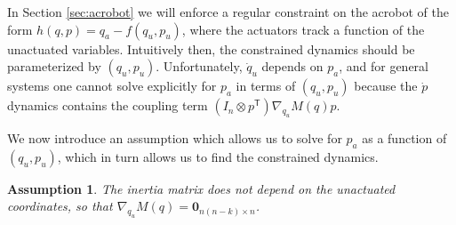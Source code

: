 \documentclass[journal,twoside,web]{ieeecolor}
\newtheorem{assm}{Assumption} %
\newcommand*{\tpose}{^\mathsf{T}}
\newcommand*{\Id}[1]{I_{#1}}
\newcommand*{\Zmat}[1]{\bm{0}_{#1}}
\begin{document}
In Section \ref{sec:acrobot} we will enforce a regular constraint on the
acrobot of the form \(h(q,p) = q_a - f(q_u,p_u)\), where the actuators track a
function of the unactuated variables.
Intuitively then, the constrained dynamics should be parameterized by \((q_u, p_u)\).
Unfortunately, \(\dot{q}_u\) depends on \(p_a\), and for general systems one
cannot solve explicitly for \(p_a\) in terms of \((q_u,p_u)\) because
the \(\dot{p}\) dynamics contains the coupling term 
\((\Id{n} \otimes p\tpose)\nabla_{q_u}M(q)p\). 

We now introduce an assumption which allows us to solve for \(p_a\) as a
function of \((q_u,p_u)\), which in turn allows us to find the constrained
dynamics.

\begin{assm}\label{assm:inertially-actuated}
The inertia matrix does not depend on the unactuated coordinates, so that 
\(\nabla_{q_u}M(q) = \Zmat{n(n-k) \times n}\).
\end{assm}
\end{document}
